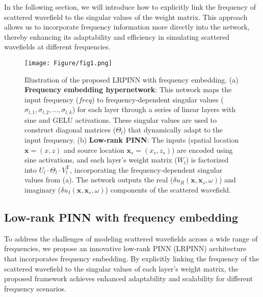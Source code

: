 In the following section, we will introduce how to explicitly link the frequency of scattered wavefield to the singular values of the weight matrix. This approach allows us to incorporate frequency information more directly into the network, thereby enhancing its adaptability and efficiency in simulating scattered wavefields at different frequencies. 

\begin{figure}[htbp]
\centering
\texttt{[image: Figure/fig1.png]}
\caption{
Illustration of the proposed LRPINN with frequency embedding. 
(a) \textbf{Frequency embedding hypernetwork}: This network maps the input frequency (\(\textit{freq}\)) to frequency-dependent singular values (\(\sigma_{l,1}, \sigma_{l,2}, \dots, \sigma_{l,k}\)) for each layer through a series of linear layers with sine and GELU activations. These singular values are used to construct diagonal matrices (\(\Theta_l\)) that dynamically adapt to the input frequency. 
(b) \textbf{Low-rank PINN}: The inputs (spatial location $\mathbf{x} =(x,z)$ and source location $\mathbf{x}_s =(x_s,z_s)$) are encoded using sine activations, and each layer's weight matrix (\(W_l\)) is factorized into \(U_l \cdot \Theta_l \cdot V_l^\text{T}\), incorporating the frequency-dependent singular values from (a). The network outputs the real (\(\delta u_R(\mathbf{x}, \mathbf{x}_s, \omega)\)) and imaginary (\(\delta u_I(\mathbf{x}, \mathbf{x}_s, \omega)\)) components of the scattered wavefield.}
\label{fig1}
\end{figure}

\subsection{Low-rank PINN with frequency embedding}
To address the challenges of modeling scattered wavefields across a wide range of frequencies, we propose an innovative low-rank PINN (LRPINN) architecture that incorporates frequency embedding. By explicitly linking the frequency of the scattered wavefield to the singular values of each layer's weight matrix, the proposed framework achieves enhanced adaptability and scalability for different frequency scenarios. 

